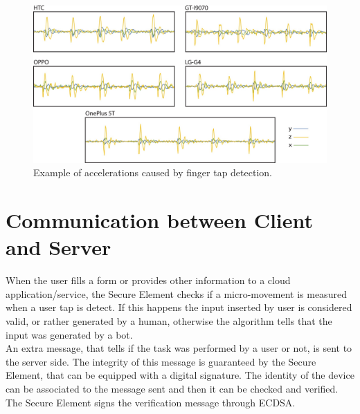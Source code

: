 \begin{figure}[h]
     \centering
     \includegraphics[width=.8\linewidth]{Images/InvisibleCAPPCHA/tap}
     \caption{\footnotesize{Example of accelerations caused by finger tap detection.}}\label{inv:tap}
\end{figure}


\section{Communication between Client and Server}\label{inv:communication}
When the user fills a form or provides other information to a cloud application/service, the Secure Element checks if a micro-movement is measured when a user tap is detect. If this happens the input inserted by user is considered valid, or rather generated by a human, otherwise the algorithm tells that the input was generated by a bot.\\
An extra message, that tells if the task was performed by a user or not, is sent to the server side. The integrity of this message is guaranteed by the Secure Element, that can be equipped with a digital signature. The identity of the device can be associated to the message sent and then it can be checked and verified. The Secure Element signs the verification message through ECDSA.

